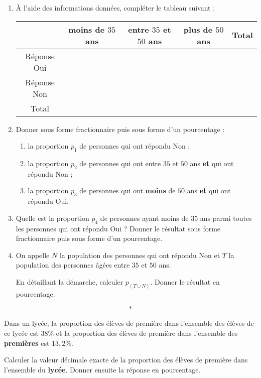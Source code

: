 \documentclass[10pt,french]{article}
\begin{document}
\begin{enumerate}
    \item À l'aide des informations données, compléter le tableau suivant :
    \begin{center}
    \renewcommand\arraystretch{1.25}
        \begin{tabular}{|c|c|c|c|c|}
            \hline
                & moins de $35$ ans & entre $35$ et $50$ ans & plus de $50$ ans & Total\\
            \hline
                Réponse Oui & & & & \\
            \hline
                Réponse Non & & & & \\
            \hline
                Total & & & & \\
            \hline
        \end{tabular}
    \renewcommand\arraystretch{1}
    \end{center}

    \item Donner sous forme fractionnaire puis sous forme d'un pourcentage :
        \begin{enumerate}
            \item la proportion $p_1$ de personnes qui ont répondu Non ;
            \item la proportion $p_2$ de personnes qui ont entre $35$ et $50$ ans \textbf{et} qui ont répondu Non ;
            \item  la proportion $p_3$ de personnes qui ont \textbf{moins} de $50$ ans \textbf{et} qui ont répondu Oui.
        \end{enumerate}
    \item Quelle est la proportion $p_4$ de personnes ayant moins de $35$ ans parmi toutes les personnes qui ont répondu Oui ?
    Donner le résultat sous forme fractionnaire puis sous forme d'un pourcentage.
    \item On appelle $N$ la population des personnes qui ont répondu Non et $T$ la population des personnes âgées entre $35$ et $50$ ans.\par
    En détaillant la démarche, calculer $p_{(T \cup N)}$. Donner le résultat en pourcentage.
\end{enumerate}\[*\]

\exo Dans un lycée, la proportion des élèves de première dans l'ensemble des élèves de ce lycée est $38\%$ et la proportion des élèves de première \stmg{} dans l'ensemble des \textbf{premières} est $13,2\%$.\par
Calculer la valeur décimale exacte de la proportion des élèves de première \stmg{} dans l'ensemble du \textbf{lycée}. Donner ensuite la réponse en pourcentage.
\end{document}
